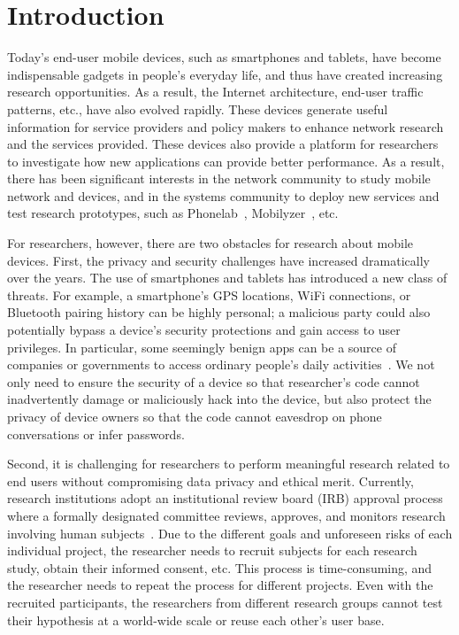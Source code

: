 \section{Introduction}

Today's end-user mobile devices, such as smartphones and
tablets, have become indispensable gadgets in people's everyday
life, and thus have created increasing research opportunities.
As a result, the Internet architecture, end-user traffic
patterns, etc., have also evolved rapidly. These devices
generate useful information for service providers and policy
makers to enhance network research and the services provided.
These devices also provide a platform for researchers to
investigate how new applications can provide better performance.
As a result, there has been significant interests in the network
community to study mobile network and devices, and in the
systems community to deploy new services and test research
prototypes, such as Phonelab~\cite{phonelab, nandugudi2013phonelab}, 
Mobilyzer~\cite{nikravesh2015mobilyzer}, etc.
					
For researchers, however, there are two obstacles for research
about mobile devices. First, the privacy and security challenges
have increased dramatically over the years. The use of 
smartphones and tablets has introduced a new class of threats. 
For example, a smartphone's GPS locations,
WiFi connections, or Bluetooth pairing history can be highly
personal; a malicious party could also potentially bypass a
device's security protections and gain access to user
privileges. In particular, some seemingly benign apps can be a 
source of companies or governments to access ordinary 
people's daily activities~\cite{AngryBirds}. 
We not only need to ensure the security of a device
so that researcher's code cannot inadvertently damage or
maliciously hack into the device, but also protect the privacy
of device owners so that the code cannot eavesdrop on phone
conversations or infer passwords.

Second, it is challenging for researchers to perform meaningful
research related to end users without compromising data privacy
and ethical merit. Currently, research institutions adopt an
institutional review board (IRB) approval process where a
formally designated committee reviews, approves, and monitors
research involving human subjects~\cite{irb}.
Due to the different goals and unforeseen risks of each
individual project, the researcher needs to recruit subjects for
each research study, obtain their informed consent, etc. This
process is time-consuming, and the researcher needs to repeat
the process for different projects. Even with the
recruited participants, the researchers from different research
groups cannot test their hypothesis at a world-wide scale or
reuse each other's user base.


